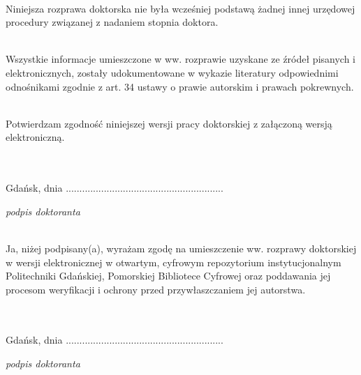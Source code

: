 \begin{myfont}
	\noindent
	\\
	Niniejsza rozprawa doktorska nie była wcześniej podstawą żadnej innej urzędowej procedury związanej z nadaniem stopnia doktora. 
	
	\noindent
	\\
	Wszystkie informacje umieszczone w ww. rozprawie uzyskane ze źródeł pisanych 
	i elektronicznych, zostały udokumentowane w wykazie literatury odpowiednimi odnośnikami zgodnie z art. 34 ustawy o prawie autorskim i prawach pokrewnych.
	
	\noindent
	\\
	Potwierdzam zgodność niniejszej wersji pracy doktorskiej z załączoną wersją elektroniczną.
	
	\noindent
	\\ \\ 
	Gdańsk, dnia .............................\hfill.............................
	
	\scriptsize \noindent
	\null\hfill \textit{podpis doktoranta}
	
	\noindent \footnotesize
	\\
	Ja, niżej podpisany(a), wyrażam zgodę na umieszczenie ww. rozprawy doktorskiej w wersji elektronicznej w otwartym, cyfrowym repozytorium instytucjonalnym Politechniki Gdańskiej, Pomorskiej Bibliotece Cyfrowej oraz poddawania jej procesom weryfikacji i ochrony przed przywłaszczaniem jej autorstwa.
	
	\noindent
	\\ \\ 
	Gdańsk, dnia .............................\hfill.............................
	
	\scriptsize \noindent
	\null\hfill \textit{podpis doktoranta}
	\vfill
	\pagebreak[4]
\end{myfont}